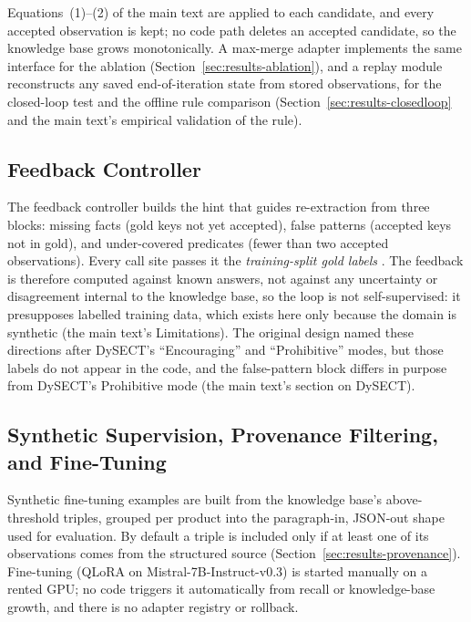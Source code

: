\documentclass[11pt]{article}
\begin{document}
Equations~(1)--(2) of the main text are applied to each
candidate, and every accepted observation is kept; no code path deletes
an accepted candidate, so the knowledge base grows monotonically. A
max-merge adapter implements the same interface for the ablation
(Section~\ref{sec:results-ablation}), and a replay module reconstructs
any saved end-of-iteration state from stored observations, for the
closed-loop test and the offline rule comparison
(Section~\ref{sec:results-closedloop} and the main text's empirical
validation of the rule).

\subsection{Feedback Controller}
\label{sec:framework-feedback}

The feedback controller builds the hint that guides re-extraction from
three blocks: missing facts (gold keys not yet
accepted), false patterns (accepted keys not in gold), and
under-covered predicates (fewer than two accepted observations). Every
call site passes it the \emph{training-split gold labels}
. The feedback is therefore computed against known answers, not against
any uncertainty or disagreement internal to the knowledge base, so the
loop is not self-supervised: it presupposes labelled training data,
which exists here only because the domain is synthetic
(the main text's Limitations). The original design named these
directions after DySECT's ``Encouraging'' and ``Prohibitive'' modes, but
those labels do not appear in the code, and the false-pattern block
differs in purpose from DySECT's Prohibitive mode
(the main text's section on DySECT).

\subsection{Synthetic Supervision, Provenance Filtering, and Fine-Tuning}
\label{sec:framework-finetuning}

Synthetic fine-tuning examples are built from the knowledge base's
above-threshold triples, grouped per product into the paragraph-in,
JSON-out shape used for evaluation. By default a triple is included only
if at least one of its observations comes from the structured source
(Section~\ref{sec:results-provenance}). Fine-tuning (QLoRA on
Mistral-7B-Instruct-v0.3) is started manually on a rented GPU; no code
triggers it automatically from recall or knowledge-base growth, and
there is no adapter registry or rollback.
\end{document}
